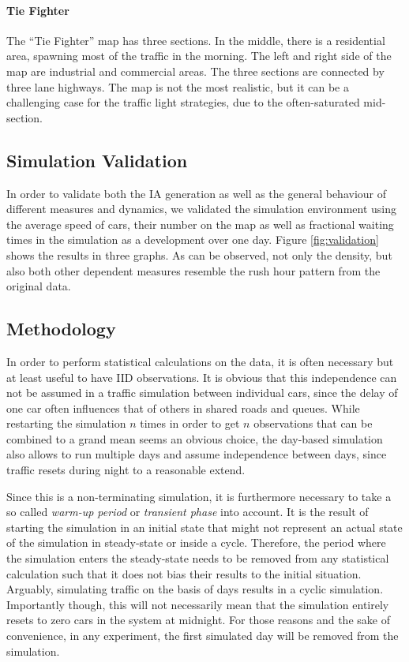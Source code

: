 \documentclass[11pt]{article}
\begin{document}
\paragraph{Tie Fighter} The “Tie Fighter” map has three sections. In the middle, there is a residential area, spawning most of the traffic in the morning. The left and right side of the map are industrial and commercial areas. The three sections are connected by three lane highways. The map is not the most realistic, but it can be a challenging case for the traffic light strategies, due to the often-saturated mid-section.

\subsection{Simulation Validation}
In order to validate both the IA generation as well as the general behaviour of different measures and dynamics, we validated the simulation environment using the average speed of cars, their number on the map as well as fractional waiting times in the simulation as a development over one day. Figure \ref{fig:validation} shows the results in three graphs. As can be observed, not only the density, but also both other dependent measures resemble the rush hour pattern from the original data.

\subsection{Methodology}
In order to perform statistical calculations on the data, it is often necessary but at least useful to have IID observations. It is obvious that this independence can not be assumed in a traffic simulation between individual cars, since the delay of one car often influences that of others in shared roads and queues. While restarting the simulation $n$ times in order to get $n$ observations that can be combined to a grand mean seems an obvious choice, the day-based simulation also allows to run multiple days and assume independence between days, since traffic resets during night to a reasonable extend.

Since this is a non-terminating simulation, it is furthermore necessary to take a so called \textit{warm-up period} or \textit{transient phase} into account. It is the result of starting the simulation in an initial state that might not represent an actual state of the simulation in steady-state or inside a cycle. Therefore, the period where the simulation enters the steady-state needs to be removed from any statistical calculation such that it does not bias their results to the initial situation. Arguably, simulating traffic on the basis of days results in a cyclic simulation. Importantly though, this will not necessarily mean that the simulation entirely resets to zero cars in the system at midnight. For those reasons and the sake of convenience, in any experiment, the first simulated day will be removed from the simulation.
\end{document}
